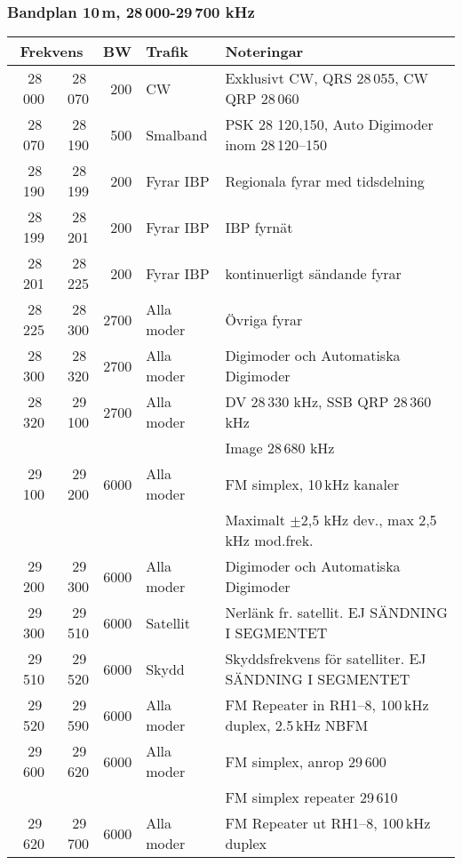 \subsubsection{Bandplan 10\,m, 28\,000-29\,700 kHz}
\begin{tabular}{rrrll}
\multicolumn{2}{c}{\textbf{Frekvens}} & \textbf{BW} & \textbf{Trafik} & \textbf{Noteringar} \\ \hline
28\,000 & 28\,070 & 200  & CW         & Exklusivt CW, QRS 28\,055, CW QRP 28\,060              \\ \hline
28\,070 & 28\,190 & 500  & Smalband   & PSK 28 120,150, Auto Digimoder inom 28\,120--150       \\ \hline
28\,190 & 28\,199 & 200  & Fyrar IBP  & Regionala fyrar med tidsdelning                        \\ \hline
28\,199 & 28\,201 & 200  & Fyrar IBP  & IBP fyrnät                                             \\ \hline
28\,201 & 28\,225 & 200  & Fyrar IBP  & kontinuerligt sändande fyrar                           \\ \hline
28\,225 & 28\,300 & 2700 & Alla moder & Övriga fyrar                                           \\ \hline
28\,300 & 28\,320 & 2700 & Alla moder & Digimoder och Automatiska Digimoder                    \\ \hline
28\,320 & 29\,100 & 2700 & Alla moder & DV 28\,330 kHz, SSB QRP 28\,360 kHz                    \\
        &         &      &            & Image 28\,680 kHz                                      \\ \hline
29\,100 & 29\,200 & 6000 & Alla moder & FM simplex, 10\,kHz kanaler                            \\
        &         &      &            & Maximalt $\pm$2,5 kHz dev., max 2,5\,kHz mod.frek.         \\ \hline
29\,200 & 29\,300 & 6000 & Alla moder & Digimoder och Automatiska Digimoder                    \\ \hline
29\,300 & 29\,510 & 6000 & Satellit   & Nerlänk fr. satellit. EJ SÄNDNING I SEGMENTET          \\ \hline
29\,510 & 29\,520 & 6000 & Skydd      & Skyddsfrekvens för satelliter. EJ SÄNDNING I SEGMENTET \\ \hline
29\,520 & 29\,590 & 6000 & Alla moder & FM Repeater in RH1--8, 100\,kHz duplex, 2.5\,kHz NBFM  \\ \hline
29\,600 & 29\,620 & 6000 & Alla moder & FM simplex, anrop 29\,600                              \\
        &         &      &            & FM simplex repeater 29\,610                            \\ \hline
29\,620 & 29\,700 & 6000 & Alla moder & FM Repeater ut RH1--8, 100\,kHz duplex                 \\ \hline
\end{tabular}
\newpage

